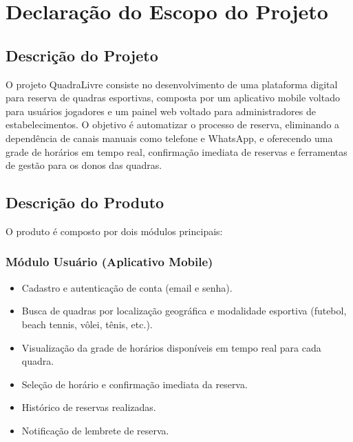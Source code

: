 \documentclass[12pt,a4paper,oneside]{report}
\begin{document}
\chapter{Declaração do Escopo do Projeto}

\section{Descrição do Projeto}

O projeto QuadraLivre consiste no desenvolvimento de uma plataforma digital para reserva de quadras esportivas, composta por um aplicativo mobile voltado para usuários jogadores e um painel web voltado para administradores de estabelecimentos. O objetivo é automatizar o processo de reserva, eliminando a dependência de canais manuais como telefone e WhatsApp, e oferecendo uma grade de horários em tempo real, confirmação imediata de reservas e ferramentas de gestão para os donos das quadras.

\section{Descrição do Produto}

O produto é composto por dois módulos principais:

\subsection{Módulo Usuário (Aplicativo Mobile)}
\begin{itemize}
    \item Cadastro e autenticação de conta (email e senha).
    \item Busca de quadras por localização geográfica e modalidade esportiva (futebol, beach tennis, vôlei, tênis, etc.).
    \item Visualização da grade de horários disponíveis em tempo real para cada quadra.
    \item Seleção de horário e confirmação imediata da reserva.
    \item Histórico de reservas realizadas.
    \item Notificação de lembrete de reserva.
\end{itemize}
\end{document}
